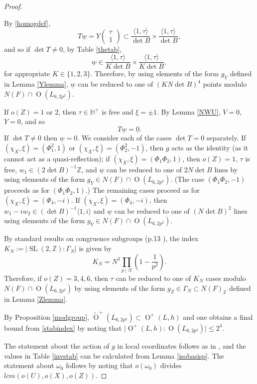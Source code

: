 \documentclass[11pt]{amsart}
\newcommand{\ZZ}{\mathbb{Z}}
\newcommand{\HH}{\mathbb{H}}
\newcommand{\la}{\langle}
\newcommand{\ra}{\rangle}
\newcommand{\bsm}{\left ( \begin{smallmatrix} }
\newcommand{\esm}{\end{smallmatrix} \right )}
\newcommand{\opn}{\operatorname}
\begin{document}
\begin{proof}
\begin{table}[h!]
\label{thetab}
\end{table}
By \eqref{homogdef},
\begin{equation*}
T \underline{w} = 
Y \bsm \tau \\ 1 \esm 
\subset 
\frac{\la 1, \tau \ra}{\opn{det} B} \times \frac{\la 1, \tau \ra}{\opn{det} B },
\end{equation*}
and so if $\opn{det} T \neq 0$, by Table \ref{thetab}, 
\begin{equation*}
\underline{w} \in
\frac{\la 1, \tau \ra}{K \opn{det} B}
\times 
\frac{\la 1, \tau \ra}{K \opn{det} B},
\end{equation*}
for appropriate $K \in \{1,2,3\}$.
Therefore, by using elements of the form $g_Y$ defined in Lemma \ref{Ylemma}, $\underline{w}$ can be reduced to one of $(K N \opn{det} B)^4$ points modulo $N(F) \cap \opn{O}(L_{6,2p^2})$.

If $o(Z) = 1$ or $2$,  then $\tau \in \HH^+$ is free and $\xi = \pm 1$.
By Lemma \ref{NWU}, $V=0$, $Y=0$, and so 
\begin{equation*}
T \underline{w} = \underline{0}.
\end{equation*}
If $\opn{det} T \neq 0$ then $\underline{w}=0$.
We consider each of the cases $\opn{det} T = 0$ separately.
If $(\chi_X, \xi) = (\Phi_1^2,1)$ or $(\chi_X, \xi)=(\Phi_2^2, -1)$, then $g$ acts as the identity (as it cannot act as a quasi-reflection); 
if $(\chi_X, \xi) = (\Phi_1 \Phi_2, 1)$, then $o(Z)=1$, $\tau$ is free, $w_1 \in (2 \opn{det} B)^{-1} \ZZ$, and $\underline{w}$ can be reduced to one of $2 N \opn{det} B$ lines by using elements of the form $g_Y \in N(F) \cap \opn{O}(L_{6,2p^2})$. 
(The case $(\Phi_1 \Phi_2, -1)$ proceeds as for $(\Phi_1 \Phi_2, 1)$.)
The remaining cases proceed as for $(\chi_X, \xi) = (\Phi_4, -i)$.
If $(\chi_X, \xi) = (\Phi_4, -i)$, then $w_1 - i w_2 \in (\opn{det} B)^{-1} \la 1, i \ra$  and $\underline{w}$ can be reduced to one of $(N \opn{det} B)^2$ lines using elements of the form $g_Y \in N(F) \cap \opn{O}(L_{6,2p^2})$.

By standard results on congruence subgroups (p.13 \cite{Diamond}), the index $K_N := \vert \opn{SL}(2, \ZZ) : \Gamma_N \vert$ is given by
\begin{equation*}
K_N = N^3 \prod_{p \mid N} \left (1 - \frac{1}{p^2} \right ).
\end{equation*}
Therefore, if $o(Z) = 3,4,6$, then $\tau$ can be reduced to one of $K_N$ cases modulo $N(F) \cap \opn{O}(L_{6,2p^2})$ by using elements of the form $g_Z \in \Gamma_N \subset N(F)_{\ZZ}$ defined in Lemma \ref{Zlemma}.


By Proposition \ref{modgroup}, $\widetilde{\opn{O}}^+(L_{6,2p^2}) \subset \opn{O}^+(L, h)$ and one obtains a final bound from \eqref{stabindex} by noting that $\vert \opn{O}^+(L, h) : \opn{O}(L_{6,2p^2}) \vert \leq 2^4$.

The statement about the action of $g$ in local coordinates follows as in \cite{Kondo}, and the values in Table \ref{invstab} can be calculated from Lemma \ref{isobasisp}.
The statement about $\omega_0$ follows by noting that $o(\omega_0)$ divides $lcm(o(U), o(X), o(Z))$. 
\end{proof}
\end{document}

